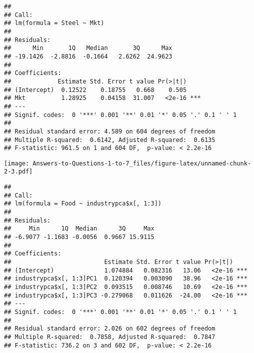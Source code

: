 \documentclass[
]{article}
\newenvironment{Shaded}{\begin{snugshade}}{\end{snugshade}}
\newcommand{\DecValTok}[1]{\textcolor[rgb]{0.00,0.00,0.81}{#1}}
\newcommand{\FunctionTok}[1]{\textcolor[rgb]{0.13,0.29,0.53}{\textbf{#1}}}
\newcommand{\NormalTok}[1]{#1}
\newcommand{\OtherTok}[1]{\textcolor[rgb]{0.56,0.35,0.01}{#1}}
\newcommand{\SpecialCharTok}[1]{\textcolor[rgb]{0.81,0.36,0.00}{\textbf{#1}}}
\begin{document}
\begin{verbatim}
## 
## Call:
## lm(formula = Steel ~ Mkt)
## 
## Residuals:
##      Min       1Q   Median       3Q      Max 
## -19.1426  -2.8816  -0.1664   2.6262  24.9623 
## 
## Coefficients:
##             Estimate Std. Error t value Pr(>|t|)    
## (Intercept)  0.12522    0.18755   0.668    0.505    
## Mkt          1.28925    0.04158  31.007   <2e-16 ***
## ---
## Signif. codes:  0 '***' 0.001 '**' 0.01 '*' 0.05 '.' 0.1 ' ' 1
## 
## Residual standard error: 4.589 on 604 degrees of freedom
## Multiple R-squared:  0.6142, Adjusted R-squared:  0.6135 
## F-statistic: 961.5 on 1 and 604 DF,  p-value: < 2.2e-16
\end{verbatim}

\begin{Shaded}
\end{Shaded}

\texttt{[image: Answers-to-Questions-1-to-7\_files/figure-latex/unnamed-chunk-2-3.pdf]}

\begin{Shaded}
\end{Shaded}

\begin{verbatim}
## 
## Call:
## lm(formula = Food ~ industrypca$x[, 1:3])
## 
## Residuals:
##     Min      1Q  Median      3Q     Max 
## -6.9077 -1.1683 -0.0056  0.9667 15.9115 
## 
## Coefficients:
##                          Estimate Std. Error t value Pr(>|t|)    
## (Intercept)              1.074884   0.082316   13.06   <2e-16 ***
## industrypca$x[, 1:3]PC1  0.120394   0.003090   38.96   <2e-16 ***
## industrypca$x[, 1:3]PC2  0.093515   0.008746   10.69   <2e-16 ***
## industrypca$x[, 1:3]PC3 -0.279068   0.011626  -24.00   <2e-16 ***
## ---
## Signif. codes:  0 '***' 0.001 '**' 0.01 '*' 0.05 '.' 0.1 ' ' 1
## 
## Residual standard error: 2.026 on 602 degrees of freedom
## Multiple R-squared:  0.7858, Adjusted R-squared:  0.7847 
## F-statistic: 736.2 on 3 and 602 DF,  p-value: < 2.2e-16
\end{verbatim}
\end{document}
